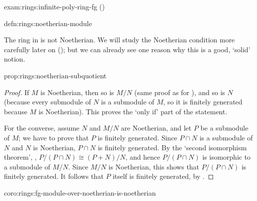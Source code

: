 \begin{exam}{}{exam:rings:infinite-poly-ring-fg}
   ()
\end{exam}
\begin{defn}{}{defn:rings:noetherian-module}
\end{defn}
 The ring in
 is not Noetherian. We will
study the Noetherian condition more carefully later on
(); but we can
already see one reason why this is a good, `solid' notion.

\begin{prop}{}{prop:rings:noetherian-subquotient}
\end{prop}
\begin{proof}
  If $M$ is Noetherian, then so is $M/N$ (same proof as for
  ), and so is $N$
  (because every submodule of $N$ is a submodule of $M$, so it is
  finitely generated because $M$ is Noetherian). This proves the `only
  if' part of the statement.

  For the converse, assume $N$ and $M/N$ are Noetherian, and let $P$
  be a submodule of $M$; we have to prove that $P$ is finitely
  generated. Since $P \cap N$ is a submodule of $N$ and $N$ is
  Noetherian, $P \cap N$ is finitely generated. By the `second
  isomorphism theorem', ,
  $P/(P \cap N) \cong (P + N)/N$, and hence $P/(P \cap N)$ is
  isomorphic to a submodule of $M/N$. Since $M/N$ is Noetherian, this
  shows that $P/(P \cap N)$ is finitely generated. It follows that $P$
  itself is finitely generated, by
  .
\end{proof}
\begin{coro}{}{coro:rings:fg-module-over-noetherian-is-noetherian}
\end{coro}

